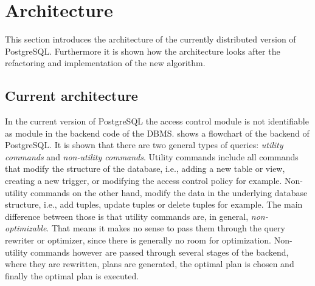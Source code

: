 \section{Architecture}
%
This section introduces the architecture of the currently distributed version of PostgreSQL.
%
Furthermore it is shown how the architecture looks after the refactoring and implementation of the new algorithm.
%
\subsection{Current architecture}


%
In the current version of PostgreSQL the access control module is not identifiable as  module in the backend code of the DBMS.
%
 shows a flowchart of the backend of PostgreSQL. 
%
It is shown that there are two general types of queries: \emph{utility commands} and \emph{non-utility commands}. 
%
Utility commands include all commands that modify the structure of the database, i.e., adding a new table or view, creating a new trigger, or modifying the access control policy  for example. 
%
Non-utility commands on the other hand, modify the data in the underlying database structure, i.e., add tuples, update tuples or delete tuples for example. 
%
The main difference between those is that utility commands are, in general, \emph{non-optimizable}. 
%
That means it makes no sense to pass them through the query rewriter or optimizer, since there is generally no room for optimization.  
%
Non-utility commands however are passed through several stages of the backend, where they are rewritten, plans are generated, the optimal plan is chosen and finally the optimal plan is executed.
